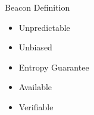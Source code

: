 \begin{frame}{Beacon Definition}
    \begin{itemize}
        \item Unpredictable 
        \item Unbiased
        \item Entropy Guarantee
        \item Available
        \item Verifiable
    \end{itemize}        
\end{frame}
